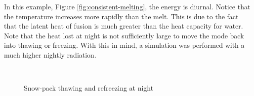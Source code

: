 \documentclass{article}
\begin{document}
In this example, Figure \ref{fig:consistent-melting}, the energy is diurnal.
Notice that the temperature increases more rapidly than the melt.
This is due to the fact that the latent heat of fusion is much
greater than the heat capacity for water.
Note that the heat lost at night is not sufficiently large
to move the mode back into thawing or freezing.
With this in mind, a simulation was performed with a much
higher nightly radiation.

\begin{figure}
\centering
\mbox{
 \quad
{} 
}
\caption{Snow-pack thawing and refreezing at night} \label{fig:refreezing-melt}
\end{figure}
\end{document}
